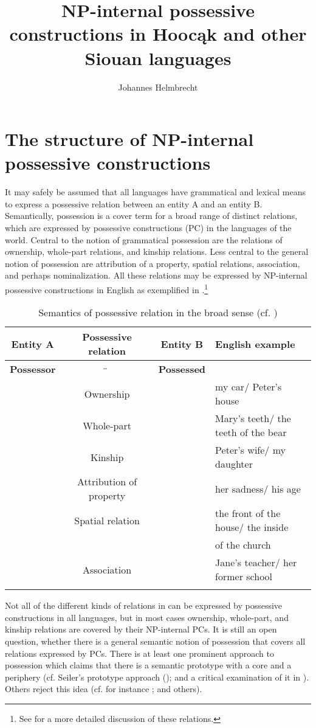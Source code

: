 \documentclass[output=paper]{LSP/langsci}
\author{Johannes Helmbrecht}
\title{NP-internal possessive constructions in Hoocąk and other Siouan languages}
\begin{document}
\section{The structure of NP-internal possessive constructions}
It may safely be assumed that all languages have grammatical and lexical means to express a possessive relation between an entity A and an entity B. Semantically, possession is a cover term for a broad range of distinct relations, which are expressed by possessive constructions (PC) in the languages of the world. Central to the notion of grammatical possession are the relations of ownership, whole-part relations, and kinship relations. Less central to the general notion of possession are attribution of a property, spatial relations, association, and perhaps nominalization. All these relations may be expressed by NP-internal possessive constructions in English as exemplified in .\footnote{See \citet[262--267]{Dixon2010} for a more detailed discussion of these relations.}

\begin{table}
\caption{Semantics of possessive relation in the broad sense (cf. \citealt[262--267]{Dixon2010})} \label{semantics}
\small
\begin{tabular}{ c c c l }
\lsptoprule
\textbf{Entity A}  & \textbf{Possessive relation}	 & \textbf{Entity B} & \textbf{English example} \\
\midrule 
\textbf{Possessor} & $\overleftrightarrow{\hspace{3cm}}$  & \textbf{Possessed} & \\
& Ownership	&  & my car/ Peter's house \\
& Whole-part	 & & Mary's teeth/ the teeth of the bear \\
& Kinship	 & & Peter's wife/ my daughter \\
& Attribution of property & & her sadness/ his age \\
& Spatial relation & & the front of the house/ the inside   \\
& & & of the church \\
& Association & & Jane's teacher/ her former school \\
\lspbottomrule
\end{tabular}
\end{table}

Not all of the different kinds of relations in  can be expressed by possessive constructions in all languages, but in most cases ownership, whole-part, and kinship relations are covered by their NP-internal PCs. It is still an open question, whether there is a general semantic notion of possession that covers all relations expressed by PCs. There is at least one prominent approach to possession which claims that there is a semantic prototype with a core and a periphery (cf. Seiler's prototype approach (\citealt{Seiler1983,Seiler2001}); and a critical examination of it in \citealt{Helmbrecht2003}). Others reject this idea (cf. for instance \citealt{Heine1997}; \citealt[263]{Dixon2010} and others).
\end{document}
